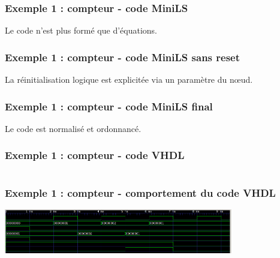 \documentclass{beamer}
\begin{document}
\begin{frame}
  \frametitle{Exemple 1 : compteur - code MiniLS}

  \footnotesize

  

  Le code n'est plus formé que d'équations.
\end{frame}

\begin{frame}
  \frametitle{Exemple 1 : compteur - code MiniLS sans reset}

  \footnotesize

  

  La réinitialisation logique est explicitée via un paramètre du nœud.
\end{frame}

\begin{frame}
  \frametitle{Exemple 1 : compteur - code MiniLS final}

  \footnotesize

  

  Le code est normalisé et ordonnancé.
\end{frame}

\begin{frame}
  \frametitle{Exemple 1 : compteur - code VHDL}

  \tiny

  \begin{columns}[t]
    \hspace{1cm}
    \begin{column}{6cm}
      
    \end{column}
    \begin{column}{6cm}
      
    \end{column}
  \end{columns}
\end{frame}

\begin{frame}
  \frametitle{Exemple 1 : compteur - comportement du code VHDL}

  \includegraphics[width=10cm]{capture-chrono-compteur}
\end{frame}
\end{document}
